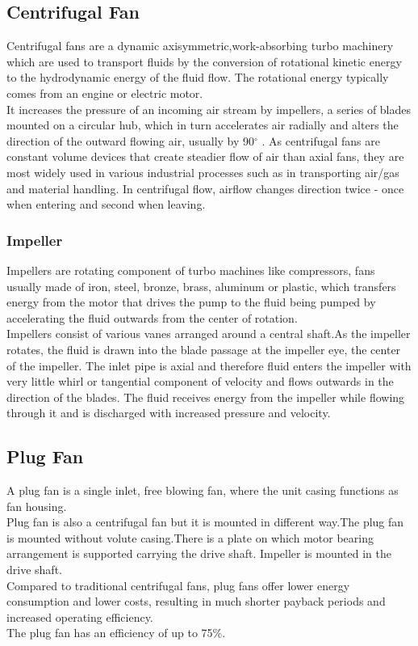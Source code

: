 \documentclass[11pt]{article}
\begin{document}
 \subsection{Centrifugal Fan}
Centrifugal fans are a dynamic axisymmetric,work-absorbing turbo machinery which are used to transport fluids by the conversion of rotational kinetic energy to the hydrodynamic energy of the fluid flow. The rotational energy typically comes from an engine or electric motor.\\
It increases the pressure of an incoming air stream by impellers, a series of blades mounted on a circular hub, which in turn accelerates air radially and alters the direction of the outward flowing air, usually by 90$^\circ$ . As centrifugal fans are constant volume devices that create steadier flow of air than axial fans, they are most widely used in various industrial processes such as in transporting air/gas and material handling.
In centrifugal flow, airflow changes direction twice - once when entering and second when leaving.
  \subsubsection{Impeller}
 Impellers are rotating component of turbo machines like compressors, fans  usually made of iron, steel, bronze, brass, aluminum or plastic, which transfers energy from the motor that drives the pump to the fluid being pumped by accelerating the fluid outwards from the center of rotation.\\
Impellers consist of various vanes arranged around a central shaft.As the impeller rotates, the fluid is drawn into the blade passage at the impeller eye, the center of the impeller. The inlet pipe is axial and therefore fluid enters the impeller with very little whirl or tangential component of velocity and flows outwards in the direction of the blades. The fluid receives energy from the impeller while flowing through it and is discharged with increased pressure and velocity.\\
 \subsection{Plug Fan}
A plug fan is a single inlet, free blowing fan, where the unit casing functions as fan housing.\\
Plug fan is also a centrifugal fan but it is mounted in different way.The plug fan is mounted without volute casing.There is a plate on which motor bearing arrangement is supported carrying the drive shaft. Impeller is mounted in the drive shaft.\\
Compared to traditional centrifugal fans, plug fans offer lower energy consumption and lower costs, resulting in much shorter payback periods and increased operating efficiency.\\ 
The plug fan has an efficiency of up to 75\%.
 
\end{document}
